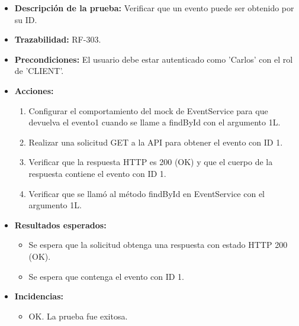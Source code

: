 \begin{itemize}
    \item \textbf{Descripción de la prueba:} Verificar que un evento puede ser obtenido por su ID.
    \item \textbf{Trazabilidad:} RF-303.
    \item \textbf{Precondiciones:} El usuario debe estar autenticado como 'Carlos' con el rol de 'CLIENT'.
    \item \textbf{Acciones:}
    \begin{enumerate}
        \item Configurar el comportamiento del mock de EventService para que devuelva el evento1 cuando se llame a findById con el argumento 1L.
        \item Realizar una solicitud GET a la API para obtener el evento con ID 1.
        \item Verificar que la respuesta HTTP es 200 (OK) y que el cuerpo de la respuesta contiene el evento con ID 1.
        \item Verificar que se llamó al método findById en EventService con el argumento 1L.
    \end{enumerate}
    \item \textbf{Resultados esperados:}
    \begin{itemize}
        \item Se espera que la solicitud obtenga una respuesta con estado HTTP 200 (OK).
        \item Se espera que contenga el evento con ID 1.
    \end{itemize}
    \item \textbf{Incidencias:}
    \begin{itemize}
        \item OK. La prueba fue exitosa.
    \end{itemize}
\end{itemize}

